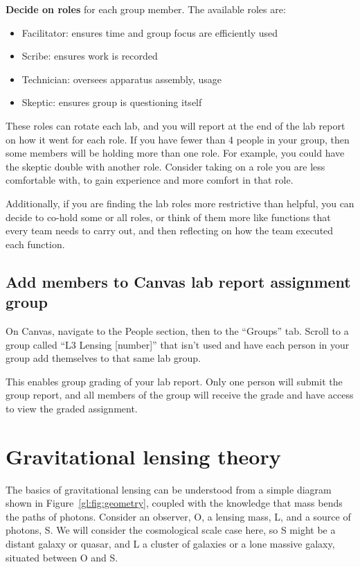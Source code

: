 \textbf{Decide on roles} for each group member. The available roles are:

\begin{itemize}
	\item Facilitator: ensures time and group focus are efficiently used
	\item Scribe: ensures work is recorded
	\item Technician: oversees apparatus assembly, usage
	\item Skeptic: ensures group is questioning itself
\end{itemize}

These roles can rotate each lab, and you will report at the end of the lab report on how it went for each role. If you have fewer than 4 people in your group, then some members will be holding more than one role. For example, you could have the skeptic double with another role. Consider taking on a role you are less comfortable with, to gain experience and more comfort in that role.

Additionally, if you are finding the lab roles more restrictive than helpful, you can decide to co-hold some or all roles, or think of them more like functions that every team needs to carry out, and then reflecting on how the team executed each function.

\subsection{Add members to Canvas lab report assignment group}

\begin{steps}
	\item On Canvas, navigate to the People section, then to the ``Groups'' tab. Scroll to a group called ``L3 Lensing [number]'' that isn't used and have each person in your group add themselves to that same lab group.
\end{steps}

This enables group grading of your lab report. Only one person will submit the group report, and all members of the group will receive the grade and have access to view the graded assignment.

\section{Gravitational lensing theory}

The basics of gravitational lensing can be understood from a simple
diagram shown in Figure~\ref{gl:fig:geometry}, coupled with the knowledge that mass bends the paths of
photons. Consider an observer, O, a lensing mass, L, and a source
of photons, S. We will consider the cosmological scale case here, so S
might be a distant galaxy or quasar, and L a cluster of
galaxies or a lone massive galaxy, situated between O and S. 

